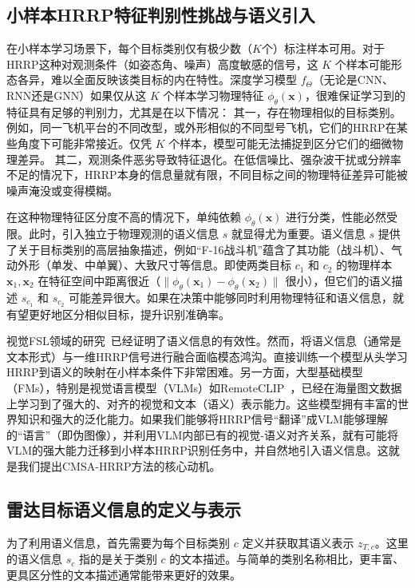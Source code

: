 \subsection{小样本HRRP特征判别性挑战与语义引入}
\label{subsec:semantic_challenge}

在小样本学习场景下，每个目标类别仅有极少数（$K$个）标注样本可用。对于HRRP这种对观测条件（如姿态角、噪声）高度敏感的信号，这 $K$ 个样本可能形态各异，难以全面反映该类目标的内在特性。深度学习模型 $f_\Theta$（无论是CNN、RNN还是GNN）如果仅从这 $K$ 个样本学习物理特征 $\phi_\theta(\mathbf{x})$，很难保证学习到的特征具有足够的判别力，尤其是在以下情况：
其一，存在物理相似的目标类别。例如，同一飞机平台的不同改型，或外形相似的不同型号飞机，它们的HRRP在某些角度下可能非常接近。仅凭 $K$ 个样本，模型可能无法捕捉到区分它们的细微物理差异。
其二，观测条件恶劣导致特征退化。在低信噪比、强杂波干扰或分辨率不足的情况下，HRRP本身的信息量就有限，不同目标之间的物理特征差异可能被噪声淹没或变得模糊。

在这种物理特征区分度不高的情况下，单纯依赖 $\phi_\theta(\mathbf{x})$ 进行分类，性能必然受限。此时，引入独立于物理观测的语义信息 $s$ 就显得尤为重要。语义信息 $s$ 提供了关于目标类别的高层抽象描述，例如“F-16战斗机”蕴含了其功能（战斗机）、气动外形（单发、中单翼）、大致尺寸等信息。即使两类目标 $c_1$ 和 $c_2$ 的物理样本 $\mathbf{x}_1, \mathbf{x}_2$ 在特征空间中距离很近（$\|\phi_\theta(\mathbf{x}_1) - \phi_\theta(\mathbf{x}_2)\|$ 很小），但它们的语义描述 $s_{c_1}$ 和 $s_{c_2}$ 可能差异很大。如果在决策中能够同时利用物理特征和语义信息，就有望更好地区分相似目标，提升识别准确率。

视觉FSL领域的研究~\cite{SemFew, CNSPN}已经证明了语义信息的有效性。然而，将语义信息（通常是文本形式）与一维HRRP信号进行融合面临模态鸿沟。直接训练一个模型从头学习HRRP到语义的映射在小样本条件下非常困难。另一方面，大型基础模型（FMs），特别是视觉语言模型（VLMs）如RemoteCLIP~\cite{RemoteCLIP}，已经在海量图文数据上学习到了强大的、对齐的视觉和文本（语义）表示能力。这些模型拥有丰富的世界知识和强大的泛化能力。如果我们能够将HRRP信号“翻译”成VLM能够理解的“语言”（即伪图像），并利用VLM内部已有的视觉-语义对齐关系，就有可能将VLM的强大能力迁移到小样本HRRP识别任务中，并自然地引入语义信息。这就是我们提出CMSA-HRRP方法的核心动机。

\subsection{雷达目标语义信息的定义与表示}
\label{subsec:semantic_representation}

为了利用语义信息，首先需要为每个目标类别 $c$ 定义并获取其语义表示 $z_{T,c}$。这里的语义信息 $s_c$ 指的是关于类别 $c$ 的文本描述。与简单的类别名称相比，更丰富、更具区分性的文本描述通常能带来更好的效果。

